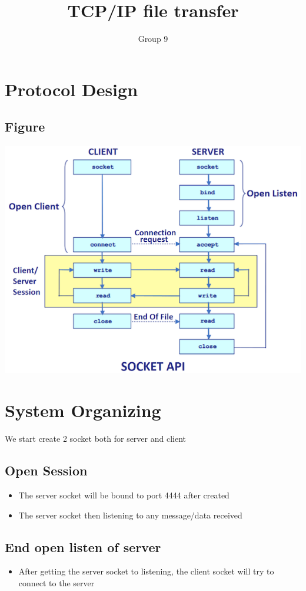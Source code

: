 \documentclass{article}
\author{Group 9}
\title{TCP/IP file transfer}
\begin{document}
\maketitle
\section{Protocol Design}
\subsection{Figure}
\includegraphics{Capture.PNG}
\newpage
\section{System Organizing}
{We start create 2 socket both for server and client}
\subsection{Open Session}
\begin{itemize}
    \item The server socket will be bound to port 4444 after created 
    \item The server socket then listening to any message/data received
\end{itemize}
\subsection{End open listen of server}
\begin{itemize}
    \item After getting the server socket to listening, the client socket will try to connect to the server
\end{itemize}
\end{document}

